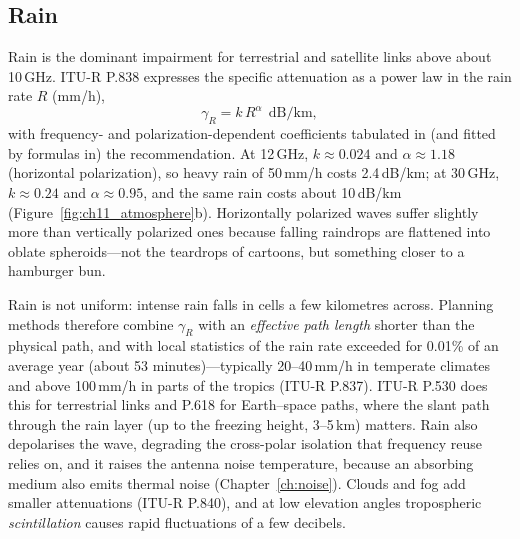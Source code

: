 \subsection{Rain}

Rain is the dominant impairment for terrestrial and satellite links above about 10\,GHz. ITU-R
P.838 expresses the specific attenuation as a power law in the rain rate $R$ (mm/h),
\begin{equation}
\gamma_R=k\,R^{\alpha}\ \ \text{dB/km},
\label{eq:ch11:rain}
\end{equation}
with frequency- and polarization-dependent coefficients tabulated in (and fitted by formulas in)
the recommendation. At 12\,GHz, $k\approx0.024$ and $\alpha\approx1.18$ (horizontal
polarization), so heavy rain of 50\,mm/h costs 2.4\,dB/km; at 30\,GHz, $k\approx0.24$ and
$\alpha\approx0.95$, and the same rain costs about 10\,dB/km (Figure~\ref{fig:ch11_atmosphere}b).
Horizontally polarized waves suffer slightly more than vertically polarized ones because falling
raindrops are flattened into oblate spheroids---not the teardrops of cartoons, but something
closer to a hamburger bun.


Rain is not uniform: intense rain falls in cells a few kilometres across. Planning methods
therefore combine $\gamma_R$ with an \emph{effective path length} shorter than the physical path,
and with local statistics of the rain rate exceeded for 0.01\% of an average year (about 53
minutes)---typically 20--40\,mm/h in temperate climates and above 100\,mm/h in parts of the
tropics (ITU-R P.837). ITU-R P.530 does this for terrestrial links and P.618 for Earth--space
paths, where the slant path through the rain layer (up to the freezing height, 3--5\,km) matters.
Rain also depolarises the wave, degrading the cross-polar isolation that frequency reuse relies
on, and it raises the antenna noise temperature, because an absorbing medium also emits thermal
noise (Chapter~\ref{ch:noise}). Clouds and fog add smaller attenuations (ITU-R P.840), and at low
elevation angles tropospheric \emph{scintillation} causes rapid fluctuations of a few decibels.

